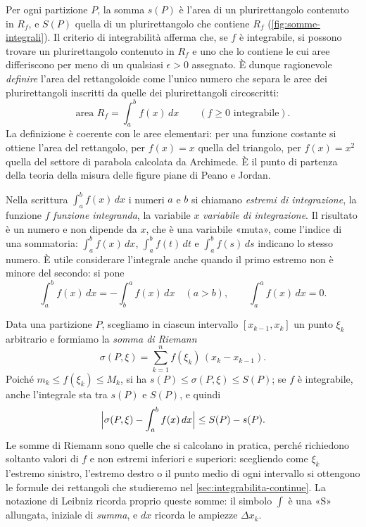 Per ogni partizione $P$, la somma $s(P)$ è l'area di un plurirettangolo contenuto in
$R_{f}$, e $S(P)$ quella di un plurirettangolo che contiene $R_{f}$
(\cref{fig:somme-integrali}). Il criterio di integrabilità afferma che, se $f$ è
integrabile, si possono trovare un plurirettangolo contenuto in $R_{f}$ e uno che lo
contiene le cui aree differiscono per meno di un qualsiasi $\epsilon>0$ assegnato. È
dunque ragionevole \emph{definire} l'area del rettangoloide come l'unico numero che
separa le aree dei plurirettangoli inscritti da quelle dei plurirettangoli
circoscritti:
\begin{equation}\label{eq:area-rettangoloide}
  \text{area }R_{f}=\int_{a}^{b}f(x)\,dx \qquad (f\ge0 \text{ integrabile}) .
\end{equation}
La definizione è coerente con le aree elementari: per una funzione costante si ottiene
l'area del rettangolo, per $f(x)=x$ quella del triangolo, per $f(x)=x^{2}$ quella del
settore di parabola calcolata da Archimede. È il punto di partenza della teoria della
misura delle figure piane di Peano e Jordan.

Nella scrittura $\int_{a}^{b}f(x)\,dx$ i numeri $a$ e $b$ si chiamano \emph{estremi di
integrazione}, la funzione $f$ \emph{funzione integranda}, la variabile $x$
\emph{variabile di integrazione}. Il risultato è un numero e non dipende da $x$, che è
una variabile «muta», come l'indice di una sommatoria: $\int_{a}^{b}f(x)\,dx$,
$\int_{a}^{b}f(t)\,dt$ e $\int_{a}^{b}f(s)\,ds$ indicano lo stesso numero. È utile
considerare l'integrale anche quando il primo estremo non è minore del secondo: si pone
\begin{equation}\label{eq:estremi-invertiti}
  \int_{a}^{b}f(x)\,dx=-\int_{b}^{a}f(x)\,dx \quad (a>b), \qquad
  \int_{a}^{a}f(x)\,dx=0 .
\end{equation}

\begin{osservazione}\label{oss:somme-riemann}
Data una partizione $P$, scegliamo in ciascun intervallo $[x_{k-1},x_{k}]$ un punto
$\xi_{k}$ arbitrario e formiamo la \emph{somma di Riemann}
\begin{equation}\label{eq:somma-riemann}
  \sigma(P,\xi)=\sum_{k=1}^{n}f(\xi_{k})\,(x_{k}-x_{k-1}) .
\end{equation}
Poiché $m_{k}\le f(\xi_{k})\le M_{k}$, si ha $s(P)\le\sigma(P,\xi)\le S(P)$; se $f$ è
integrabile, anche l'integrale sta tra $s(P)$ e $S(P)$, e quindi
\begin{equation}\label{eq:riemann-stima}
  \Bigl|\sigma(P,\xi)-\int_{a}^{b}f(x)\,dx\Bigr|\le S(P)-s(P) .
\end{equation}
Le somme di Riemann sono quelle che si calcolano in pratica, perché richiedono soltanto
valori di $f$ e non estremi inferiori e superiori: scegliendo come $\xi_{k}$ l'estremo
sinistro, l'estremo destro o il punto medio di ogni intervallo si ottengono le formule
dei rettangoli che studieremo nel \cref{sec:integrabilita-continue}. La notazione di
Leibniz ricorda proprio queste somme: il simbolo $\int$ è una «S» allungata, iniziale
di \emph{summa}, e $dx$ ricorda le ampiezze $\Delta x_{k}$.
\end{osservazione}

